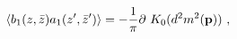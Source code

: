 \begin{equation}\label{2.15}
\langle b_1(z,\bar{z}) a_1(z',\bar{z}') \rangle=
-{1 \over \pi} \partial ~K_0(d^2 m^2({\bf p}))~,
\end{equation}

